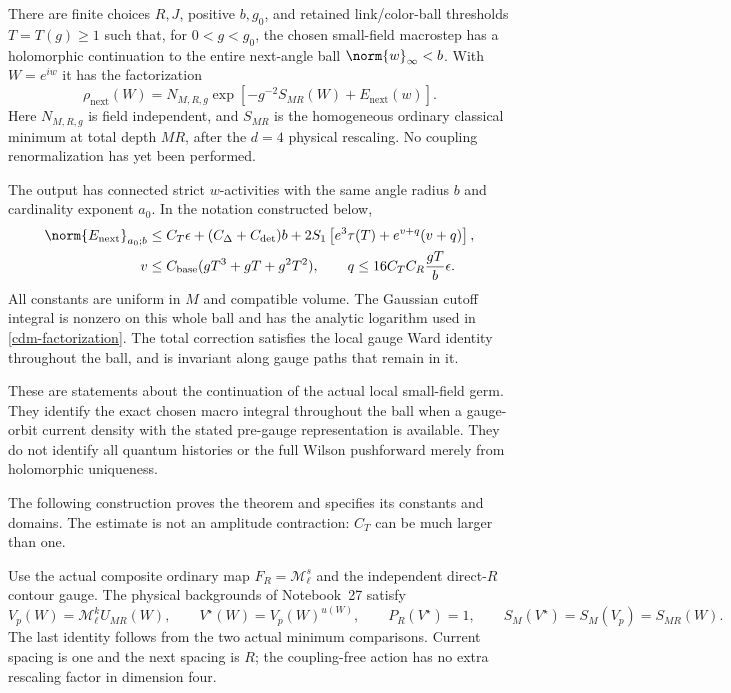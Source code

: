 \begin{theorem}
\label{cdm-theorem}
There are finite choices $R,J$, positive $b,g_0$, and retained
link/color-ball thresholds $T=T(g)\ge1$ such that, for
$0<g<g_0$, the chosen small-field macrostep has a holomorphic
continuation to the entire next-angle ball $\norm{w}_\infty<b$.
With $W=e^{iw}$ it has the factorization
\begin{equation}
 \rho_{\mathrm{next}}(W)=
 N_{M,R,g}\exp\left[-g^{-2}S_{MR}(W)+E_{\mathrm{next}}(w)\right].
 \label{cdm-factorization}
\end{equation}
Here $N_{M,R,g}$ is field independent, and $S_{MR}$ is the
homogeneous ordinary classical minimum at total depth $MR$,
after the $d=4$ physical rescaling. No coupling renormalization
has yet been performed.

The output has connected strict $w$-activities with the same
angle radius $b$ and cardinality exponent $a_0$. In the notation
constructed below,
\begin{align}
 \norm{E_{\mathrm{next}}}_{a_0;b}
 &\le C_T\epsilon+(C_\Delta+C_{\det})b
       +2S_1\left[e^3\tau(T)+e^{v+q}(v+q)\right],
 \label{cdm-output-bound}\\
 v&\le C_{\mathrm{base}}(gT^3+gT+g^2T^2),\qquad
 q\le16C_TC_R\frac{gT}{b}\epsilon .
 \label{cdm-small-factors}
\end{align}
All constants are uniform in $M$ and compatible volume. The
Gaussian cutoff integral is nonzero on this whole ball and has
the analytic logarithm used in \eqref{cdm-factorization}.
The total correction satisfies the local gauge Ward identity
throughout the ball, and is invariant along gauge paths that
remain in it.

These are statements about the continuation of the actual local
small-field germ. They identify the exact chosen macro integral
throughout the ball when a gauge-orbit current density with the
stated pre-gauge representation is available. They do not identify
all quantum histories or the full Wilson pushforward merely from
holomorphic uniqueness.
\end{theorem}

The following construction proves the theorem and specifies its
constants and domains. The estimate is not an amplitude
contraction: $C_T$ can be much larger than one.

Use the actual composite ordinary map
$F_R=\mathcal M_\ell^s$ and the independent direct-$R$ contour
gauge. The physical backgrounds of Notebook~27 satisfy
\begin{equation}
 V_p(W)=\mathcal M_\ell^k U_{MR}(W),\qquad
 V^\star(W)=V_p(W)^{u(W)},\qquad P_R(V^\star)=1,
 \qquad S_M(V^\star)=S_M(V_p)=S_{MR}(W).
 \label{cdm-background}
\end{equation}
The last identity follows from the two actual minimum comparisons.
Current spacing is one and the next spacing is $R$; the
coupling-free action has no extra rescaling factor in dimension
four.

